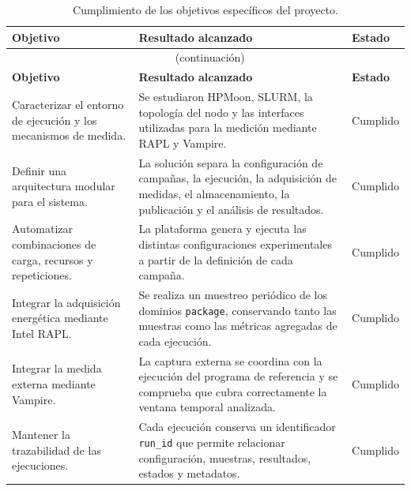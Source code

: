 \begin{longtable}{|p{}|p{}|p{}|}
    \caption{Cumplimiento de los objetivos específicos del proyecto.}
    \label{tab:cumplimiento-objetivos}\\
    \hline
    \textbf{Objetivo} & \textbf{Resultado alcanzado} & \textbf{Estado} \\
    \hline
    \endfirsthead

    \multicolumn{3}{c}{\tablename\ \thetable{} (continuación)}\\
    \hline
    \textbf{Objetivo} & \textbf{Resultado alcanzado} & \textbf{Estado} \\
    \hline
    \endhead

    Caracterizar el entorno de ejecución y los mecanismos de medida. &
    Se estudiaron HPMoon, SLURM, la topología del nodo y las interfaces utilizadas para la medición mediante RAPL y Vampire. &
    Cumplido \\
    \hline

    Definir una arquitectura modular para el sistema. &
    La solución separa la configuración de campañas, la ejecución, la adquisición de medidas, el almacenamiento, la publicación y el análisis de resultados. &
    Cumplido \\
    \hline

    Automatizar combinaciones de carga, recursos y repeticiones. &
    La plataforma genera y ejecuta las distintas configuraciones experimentales a partir de la definición de cada campaña. &
    Cumplido \\
    \hline

    Integrar la adquisición energética mediante Intel RAPL. &
    Se realiza un muestreo periódico de los dominios \texttt{package}, conservando tanto las muestras como las métricas agregadas de cada ejecución. &
    Cumplido \\
    \hline

    Integrar la medida externa mediante Vampire. &
    La captura externa se coordina con la ejecución del programa de referencia y se comprueba que cubra correctamente la ventana temporal analizada. &
    Cumplido \\
    \hline

    Mantener la trazabilidad de las ejecuciones. &
    Cada ejecución conserva un identificador \texttt{run\_id} que permite relacionar configuración, muestras, resultados, estados y metadatos. &
    Cumplido \\
    \hline


\end{longtable}
